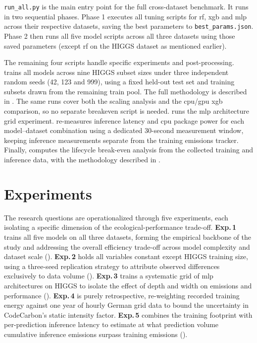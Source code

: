 \texttt{run\_all.py} is the main entry point for the full cross-dataset benchmark. It runs in two sequential phases. Phase 1 executes all tuning scripts for \gls{rf}, \gls{xgb} and \gls{mlp} across their respective datasets, saving the best parameters to \texttt{best\_params.json}. Phase 2 then runs all five model scripts across all three datasets using those saved parameters (except \gls{rf} on the HIGGS dataset as mentioned earlier).

The remaining four scripts handle specific experiments and post-processing.  trains all models across nine HIGGS subset sizes under three independent random seeds (42, 123 and 999), using a fixed held-out test set and training subsets drawn from the remaining train pool. The full methodology is described in . The same runs cover both the scaling analysis and the \gls{cpu}/\gls{gpu} \gls{xgb} comparison, so no separate breakeven script is needed.  runs the \gls{mlp} architecture grid experiment.  re-measures inference latency and \gls{cpu} package power for each model--dataset combination using a dedicated 30-second measurement window, keeping inference measurements separate from the training emissions tracker. Finally,  computes the lifecycle break-even analysis from the collected training and inference data, with the methodology described in .

\section{Experiments}
\label{sec:experiments}

The research questions are operationalized through five experiments, each isolating a specific dimension of the ecological-performance trade-off. \textbf{Exp.\,1} trains all five models on all three datasets, forming the empirical backbone of the study and addressing the overall efficiency trade-off across model complexity and dataset scale (). \textbf{Exp.\,2} holds all variables constant except HIGGS training size, using a three-seed replication strategy to attribute observed differences exclusively to data volume (). \textbf{Exp.\,3} trains a systematic grid of \gls{mlp} architectures on HIGGS to isolate the effect of depth and width on emissions and performance (). \textbf{Exp.\,4} is purely retrospective, re-weighting recorded training energy against one year of hourly German grid data to bound the uncertainty in CodeCarbon's static intensity factor. \textbf{Exp.\,5} combines the training footprint with per-prediction inference latency to estimate at what prediction volume cumulative inference emissions surpass training emissions ().


